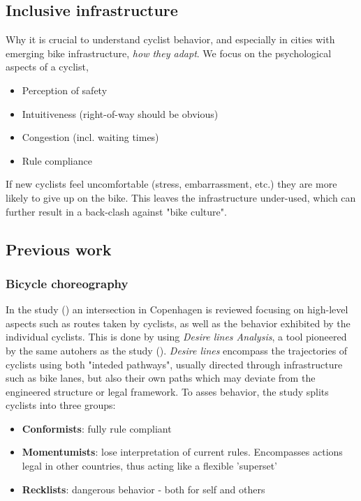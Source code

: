 \subsection{Inclusive infrastructure}


\color{red}
Why it is crucial to understand cyclist behavior, and especially in cities with emerging bike infrastructure, \textit{how they adapt}.
We focus on the psychological aspects of a cyclist,

\begin{itemize}
	\item Perception of safety
	\item Intuitiveness (right-of-way should be obvious)
	\item Congestion (incl. waiting times)
	\item Rule compliance
\end{itemize}

If new cyclists feel uncomfortable (stress, embarrassment, etc.) they are more likely to give up on the bike. This leaves the infrastructure 
under-used, which can further result in a back-clash against "bike culture". 
\ \\

\color{black}
\subsection{Previous work}

\subsubsection{Bicycle choreography}
In the study (\cite{copenhagenize2014}) an intersection in Copenhagen is reviewed focusing on high-level aspects
such as routes taken by cyclists, as well as the behavior exhibited by the individual cyclists.
This is done by using \textit{Desire lines Analysis}, a tool pioneered by the same autohers as the study (\cite{copenhagenize_book}).
\textit{Desire lines} encompass the trajectories of cyclists using both "inteded pathways", usually directed through infrastructure such as
 bike lanes, but also their own paths which may deviate from the engineered structure or legal framework.
 To asses behavior, the study splits cyclists into three groups:

\begin{itemize}
	\item \textbf{Conformists}: fully rule compliant
	\item \textbf{Momentumists}: lose interpretation of current rules. Encompasses actions legal in other countries, thus acting like a  flexible 'superset'
	\item \textbf{Recklists}: dangerous behavior - both for self and others
\end{itemize}

